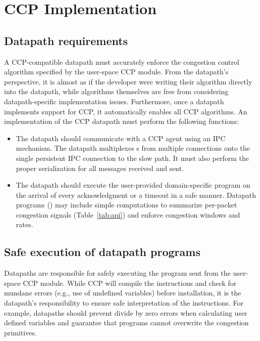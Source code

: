 \section{CCP Implementation}
\label{s:datapath}
%
\subsection{Datapath requirements}
\label{sec:implementation-basics}
A CCP-compatible datapath must accurately enforce the congestion
control algorithm specified by the user-space CCP module.
From the datapath’s perspective, it is
almost as if the developer were writing their algorithm directly
into the datapath, while algorithms themselves are free from considering datapath-specific implementation issues.
Furthermore, once a datapath implements
support for CCP, it automatically enables all CCP algorithms.
An implementation of the CCP datapath must perform the following functions:
\begin{itemize}
\item The datapath should communicate with a \userspace CCP agent using an IPC
  mechanism. The datapath multiplexes s from multiple connections
  onto the single persistent IPC connection to the slow path. It must also perform
  the proper serialization for all messages received and sent.
\item The datapath should execute the user-provided domain-specific program on
  the arrival of every acknowledgment or a timeout in a safe manner. Datapath
  programs () may include simple computations to summarize
  per-packet congestion signals (Table~\ref{tab:api}) and enforce congestion
  windows and rates.
\end{itemize}

\subsection{Safe execution of datapath programs}
\label{s:datapath:fold}
Datapaths are responsible for safely executing the program sent from the user-space CCP module. While CCP will compile the instructions and check for mundane errors (e.g., use of undefined variables) before installation, it is the datapath’s responsibility to ensure safe interpretation of the instructions. For example, datapaths should prevent divide by zero errors when calculating user defined variables and guarantee that programs cannot overwrite the congestion primitives.

